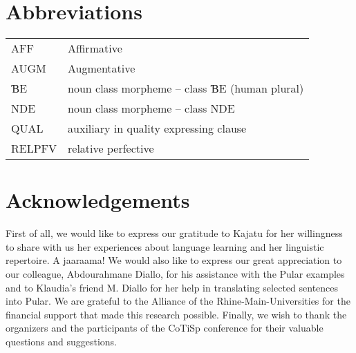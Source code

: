 \documentclass[output=paper]{langscibook}
\begin{document}


\section*{Abbreviations}
\begin{tabularx}{\textwidth}{lQ}
\textsc{\small AFF}	&Affirmative\\
AUGM &	Augmentative\\
ƁE	& noun class morpheme – class ƁE (human plural)\\
NDE &	noun class morpheme – class NDE \\
QUAL &	auxiliary in quality expressing clause \\
RELPFV	& relative perfective \\
\end{tabularx}


\section*{Acknowledgements}

First of all, we would like to express our gratitude to Kajatu for her willingness to share with us her experiences about language learning and her linguistic repertoire. A jaaraama! We would also like to express our great appreciation to our colleague, Abdourahmane Diallo, for his assistance with the Pular examples and to Klaudia’s friend M. Diallo for her help in translating selected sentences into Pular. We are grateful to the Alliance of the Rhine-Main-Universities for the financial support that made this research possible. Finally, we wish to thank the organizers and the participants of the CoTiSp conference for their valuable questions and suggestions.



\printbibliography[heading=subbibliography, notkeyword=this]
\end{document}
